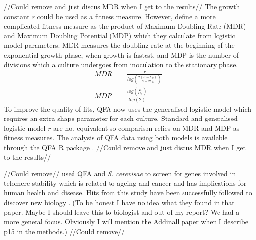 //Could remove and just discus MDR when I get to the results//
The growth constant \(r\) could be used as a fitness measure. However,
\citet{Addinall2011} define a more complicated fitness measure as the
product of Maximum Doubling Rate (MDR) and Maximum Doubling Potential
(MDP) which they calculate from logistic model parameters. MDR measures
the doubling rate at the beginning of the exponential growth phase,
when growth is fastest, and MDP is the number of divisions which a
culture undergoes from inoculation to the stationary phase.
%
\begin{subequations}
  \label{eq:MDR_MDP}
    \begin{align}
      MDR &= \frac{r}{log\left(\frac{2(K-C_0)}{K-2C_0}\right)}\\
      MDP &= \frac{log\left(\frac{K}{C_0}\right)}{log(2)}
    \end{align}
\end{subequations}
%
To improve the quality of fits, QFA now uses the generalised logistic
model which requires an extra shape parameter for each
culture. Standard and generalised logistic model \(r\) are not
equivalent so comparison relies on MDR and MDP as fitness
measures. The analysis of QFA data using both models is available
through the QFA R package \citep{qfa2016}.  //Could remove and just
discus MDR when I get to the results//


//Could remove//\citet{Addinall2011} used QFA and
\textit{S. cerevisae} to screen for genes involved in telomere
stability which is related to ageing and cancer and has implications
for human health and disease. Hits from this study have been
successfully followed to discover new biology
\citep{Holstein20141259}. (To be honest I have no idea what they found
in that paper. Maybe I should leave this to biologist and out of my
report? We had a more general focus. Obviously I will mention the
Addinall paper when I describe p15 in the methods.)  //Could remove//





